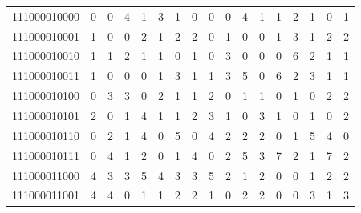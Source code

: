 \documentclass[10pt,a4paper]{article}
\begin{document}
\begin{longtable}{ |c|c|c|c|c|c|c|c|c|c|c|c|c|c|c|c|c| }
    111000010000              & 0                            & 0                                & 4                            & 1                              & 3   & 1   & 0   & 0   & 0   & 4   & 1   & 1   & 2   & 1   & 0   & 1   \\
    111000010001              & 1                            & 0                                & 0                            & 2                              & 1   & 2   & 2   & 0   & 1   & 0   & 0   & 1   & 3   & 1   & 2   & 2   \\
    111000010010              & 1                            & 1                                & 2                            & 1                              & 1   & 0   & 1   & 0   & 3   & 0   & 0   & 0   & 6   & 2   & 1   & 1   \\
    111000010011              & 1                            & 0                                & 0                            & 0                              & 1   & 3   & 1   & 1   & 3   & 5   & 0   & 6   & 2   & 3   & 1   & 1   \\
    111000010100              & 0                            & 3                                & 3                            & 0                              & 2   & 1   & 1   & 2   & 0   & 1   & 1   & 0   & 1   & 0   & 2   & 2   \\
    111000010101              & 2                            & 0                                & 1                            & 4                              & 1   & 1   & 2   & 3   & 1   & 0   & 3   & 1   & 0   & 1   & 0   & 2   \\
    111000010110              & 0                            & 2                                & 1                            & 4                              & 0   & 5   & 0   & 4   & 2   & 2   & 2   & 0   & 1   & 5   & 4   & 0   \\
    111000010111              & 0                            & 4                                & 1                            & 2                              & 0   & 1   & 4   & 0   & 2   & 5   & 3   & 7   & 2   & 1   & 7   & 2   \\
    111000011000              & 4                            & 3                                & 3                            & 5                              & 4   & 3   & 3   & 5   & 2   & 1   & 2   & 0   & 0   & 1   & 2   & 2   \\
    111000011001              & 4                            & 4                                & 0                            & 1                              & 1   & 2   & 2   & 1   & 0   & 2   & 2   & 0   & 0   & 3   & 1   & 3   \\

\end{longtable}
\end{document}
